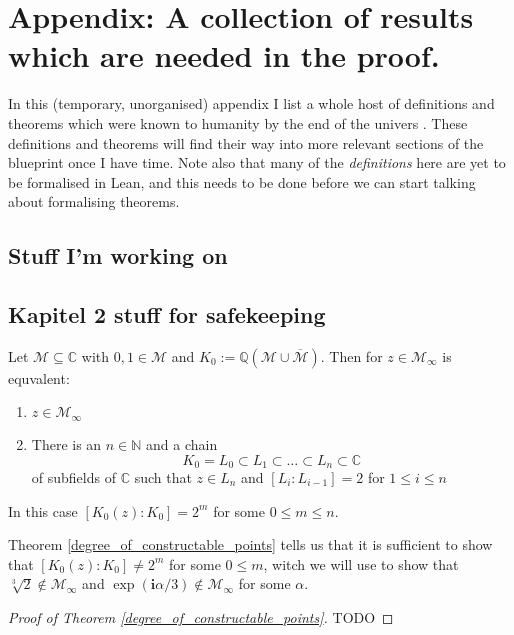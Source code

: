 \chapter{Appendix: A collection of results which are needed in the proof.}
\label{ch_bestiary}
In this (temporary, unorganised) appendix I list a whole host of definitions and theorems which were known to humanity by the end of the univers \cite{JAN_SCHRÖER:2023}. These definitions and theorems will find their way into more relevant sections of the blueprint once I have time. Note also that many of the \emph{definitions} here are yet to be formalised in Lean, and this needs to be done before we can start talking about formalising theorems.


\section*{Stuff I'm working on}



\section{Kapitel 2 stuff for safekeeping}

\begin{theorem}
\label{degree_of_constructable_points}
    Let $\mathcal{M}\subseteq\mathbb{C}$ with $0,1 \in \mathcal{M}$ and $K_0 := \mathbb{Q}(\mathcal{M}\cup \overline{\mathcal{M}})$.
    Then for $z \in \mathcal{M}_{\infty}$ is equvalent:
    \begin{enumerate}
        \item $z \in \mathcal{M}_{\infty}$
        \item There is an $n \in \mathbb{N}$ and a chain \begin{equation*}
            K_0 = L_0 \subset L_1 \subset \dots \subset L_n \subset \mathbb{C}
        \end{equation*}
        of subfields of $\mathbb{C}$ such that $z \in L_n$ and $[L_i:L_{i-1}] =2$ for $1\le i\le n$ %
    \end{enumerate}
    In this case $[K_0(z):K_0] = 2^m$ for some $0 \le m \le n$.
\end{theorem}
\begin{remark}
    Theorem \ref{degree_of_constructable_points} tells us that it is sufficient to show that $[K_0(z):K_0] \ne 2^m$ for some $0 \le m $, witch we will use to show that $\sqrt[3]{2} \notin \mathcal{M}_{\infty}$ and $\exp(\textbf{i} \alpha/3) \notin \mathcal{M}_{\infty}$ for some $\alpha$.
\end{remark}
\begin{proof}[Proof of Theorem \ref{degree_of_constructable_points}]
    TODO %
\end{proof}

